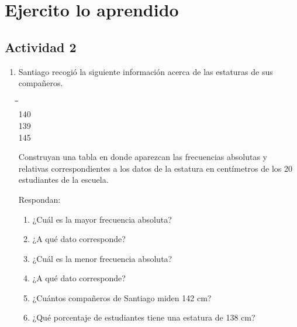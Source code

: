 \documentclass[10pt,twoside]{article}
\begin{document}
\section*{Ejercito lo aprendido}
\subsection*{Actividad 2}
\begin{enumerate}
\item Santiago recogi\'{o} la siguiente informaci\'{o}n acerca de las estaturas de sus compañeros.
\begin{center}
\begin{tabbing}
\hspace{1.5cm}\=\hspace{1.5cm}\=\hspace{1.5cm}\=\hspace{1.5cm}\=    \\ 
140     \\ 
139    \\ 
145    
\end{tabbing} 
\end{center}
Construyan una tabla en donde aparezcan las frecuencias absolutas y relativas correspondientes a los datos de la estatura en centímetros de los 20 estudiantes de la escuela.

Respondan:
\begin{enumerate}
\item ¿Cuál es la mayor frecuencia absoluta?
\item ¿A qué dato corresponde?
\item ¿Cuál es la menor frecuencia absoluta?
\item ¿A qué dato corresponde?
\item ¿Cuántos compañeros de Santiago miden 142 cm?
\item ¿Qué porcentaje de estudiantes tiene una estatura de 138 cm?
\end{enumerate}

\end{enumerate}
\end{document}

